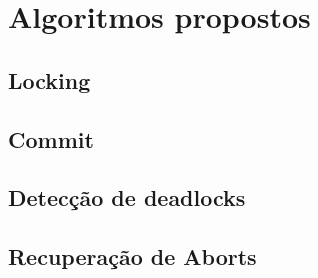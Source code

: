 \section{Algoritmos propostos}

\subsection{Locking}

\subsection{Commit}

\subsection{Detecção de deadlocks}

\subsection{Recuperação de Aborts}
